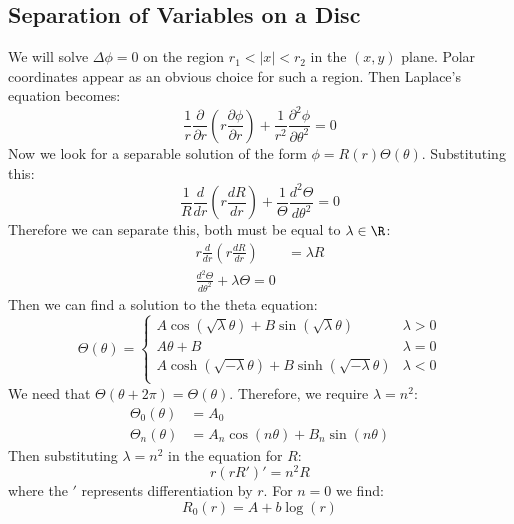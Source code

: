 \documentclass[../Main.tex]{subfiles}
\begin{document}
\subsection{Separation of Variables on a Disc}
We will solve $\Delta \phi = 0$ on the region $r_1 < |x| < r_2$ in the $(x, y)$ plane. Polar coordinates appear as an obvious choice for such a region. Then Laplace's equation becomes:
\begin{equation*}
    \frac{1}{r} \frac{\partial }{\partial r} \left(r \frac{\partial \phi}{\partial r}\right) + \frac{1}{r^2} \frac{\partial^{2}\phi}{\partial \theta^{2}} = 0
\end{equation*}
Now we look for a separable solution of the form $\phi = R(r) \Theta(\theta)$. Substituting this:
\begin{equation}
    \frac{1}{R}\frac{d}{dr}\left(r \frac{dR}{dr}\right) + \frac{1}{\Theta} \frac{d^{2}\Theta}{d\theta^{2}} = 0
    \label{eqnDiscSeparated}
\end{equation}
Therefore we can separate this, both must be equal to $\lambda \in \R$:
\begin{align*}
    r \frac{d}{dr}\left(r \frac{dR}{dr}\right) &= \lambda R \\
    \frac{d^{2}\Theta}{d\theta^{2}} + \lambda \Theta = 0
\end{align*}
Then we can find a solution to the theta equation:
\begin{equation*}
    \Theta(\theta) =
    \begin{cases}
        A \cos(\sqrt{\lambda}\theta) + B\sin(\sqrt{\lambda} \theta) & \lambda > 0 \\
        A\theta + B & \lambda = 0 \\
        A \cosh(\sqrt{-\lambda}\theta) + B\sinh(\sqrt{-\lambda} \theta) & \lambda < 0 \\
    \end{cases}
\end{equation*}
We need that $\Theta(\theta + 2\pi) = \Theta(\theta)$. Therefore, we require $\lambda = n^2$:
\begin{align*}
    \Theta_0 (\theta) &= A_0 \\
    \Theta_n(\theta) &= A_n \cos(n\theta) + B_n \sin(n\theta)
\end{align*}
Then substituting $\lambda = n^2$ in the equation for $R$:
\begin{equation*}
    r(rR')' = n^2 R
\end{equation*}
where the $'$ represents differentiation by $r$. For $n = 0$ we find:
\begin{equation*}
    R_0(r) = A + b\log(r)
\end{equation*}
\end{document}
